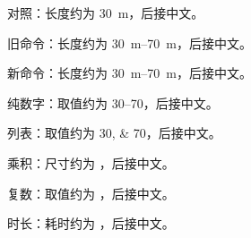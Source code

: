 \documentclass{article}
\begin{document}
对照：长度约为 \SI{30}{\metre}，后接中文。\par
旧命令：长度约为 \SIrange{30}{70}{\metre}，后接中文。\par
新命令：长度约为 \qtyrange{30}{70}{\metre}，后接中文。\par
纯数字：取值约为 \numrange{30}{70}，后接中文。\par
列表：取值约为 \numlist{30;70}，后接中文。\par
乘积：尺寸约为 ，后接中文。\par
复数：取值约为 ，后接中文。\par
时长：耗时约为 ，后接中文。\par
\end{document}
